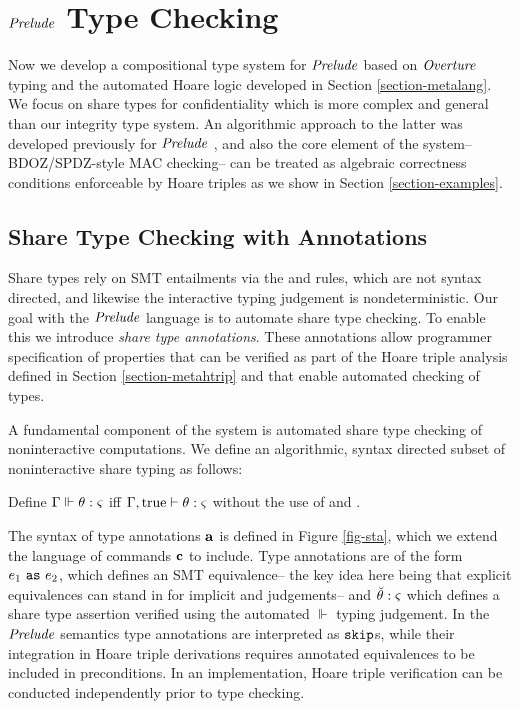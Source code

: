 \section{$\mathit{Prelude}$ Type Checking}
\label{sec:metapr-type-check}

\stafig

Now we develop a compositional type system for $\mathit{Prelude}$ based on 
$\mathit{Overture}$ typing and the automated Hoare logic developed in
Section \ref{section-metalang}. We focus on share types for confidentiality
which is more complex and general than our integrity type system.
An algorithmic approach to the latter was developed previously for
$\mathit{Prelude}$ \cite{skalka-near-esop25}, and also the core element
of the system-- BDOZ/SPDZ-style MAC checking-- can be treated as
algebraic correctness conditions enforceable by Hoare triples
as we show in Section \ref{section-examples}.

\subsection{Share Type Checking with Annotations}
\label{section-metaty}

Share types rely on SMT entailments via the  and
 rules, which are not syntax directed, and likewise
the interactive typing judgement is nondeterministic. Our goal
with the $\mathit{Prelude}$ language is to automate share type checking. To
enable this we introduce \emph{share type annotations}. These
annotations allow programmer specification of properties that can be
verified as part of the Hoare triple analysis defined in Section
\ref{section-metahtrip} and that enable automated checking of types.

A fundamental component of the system is automated share type checking
of noninteractive computations.  We define an algorithmic, syntax
directed subset of noninteractive share typing as follows:
\begin{definition}
  Define $\Gamma \Vdash \theta : \varsigma$ iff $\Gamma,\mathrm{true} \vdash \theta : \varsigma$ without the
  use of  and .
\end{definition}

\shtripstafig

The syntax of type annotations $\mathbf{a}$ is defined in Figure
\ref{fig-sta}, which we extend the language of commands $\mathbf{c}$ to
include. Type annotations are of the form $e_1 \ \texttt{as}\  e_2$, which
defines an SMT equivalence-- the key idea here being that explicit
equivalences can stand in for implicit  and
 judgements-- and $\breve{\theta} : \varsigma$ which
defines a share type assertion verified using the automated $\Vdash$
typing judgement. In the $\mathit{Prelude}$ semantics type annotations are
interpreted as $\texttt{skip}$s, while their integration in Hoare triple
derivations requires annotated equivalences to be included in
preconditions.  In an implementation, Hoare triple verification can be
conducted independently prior to type checking.

